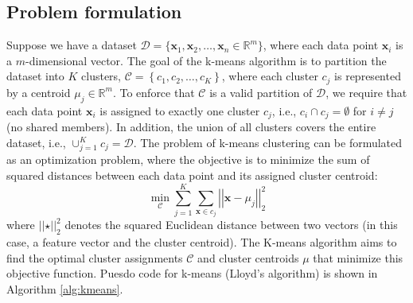 \documentclass{article}[11pt]
\newcommand{\norm}[1]{\left|\left|#1\right|\right|}
\begin{document}
\subsection{Problem formulation}
Suppose we have a dataset $\mathcal{D} = \{\mathbf{x}_1, \mathbf{x}_2, \ldots, \mathbf{x}_n\in\mathbb{R}^{m}\}$, where each data point $\mathbf{x}_i$ is a $m$-dimensional vector.
The goal of the k-means algorithm is to partition the dataset into $K$ clusters, $\mathcal{C} = \left\{c_{1},c_{2},\dots, c_{K}\right\}$, 
where each cluster $c_{j}$ is represented by a centroid $\mu_j\in\mathbb{R}^{m}$. To enforce that $\mathcal{C}$ is a valid partition of $\mathcal{D}$, we require that each data point $\mathbf{x}_i$ is assigned to exactly one cluster $c_{j}$, i.e., $c_{i}\cap c_{j} = \emptyset$ for $i\neq j$ (no shared members).
In addition, the union of all clusters covers the entire dataset, i.e., $\cup_{j=1}^{K}c_{j} = \mathcal{D}$.
The problem of k-means clustering can be formulated as an optimization problem, where the objective is to minimize the sum of squared distances between each data point and its assigned cluster centroid:
\begin{equation}
\min_{\mathcal{C}} \sum_{j=1}^{K}\sum_{\mathbf{x}\in c_{j}}\norm{\mathbf{x} - \mu_{j}}_{2}^{2}
\end{equation}
where $\norm{\star}_{2}^{2}$ denotes the squared Euclidean distance between two vectors (in this case, a feature vector and the cluster centroid). 
The K-means algorithm aims to find the optimal cluster assignments $\mathcal{C}$ and cluster centroids $\mu$ that minimize this objective function.
Puesdo code for k-means (Lloyd's algorithm) is shown in Algorithm \ref{alg:kmeans}.
\end{document}
